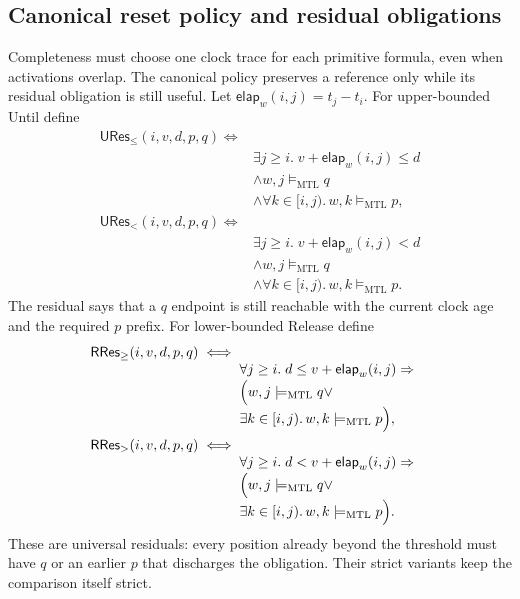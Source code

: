 \documentclass{ieeeaccess}
\newcommand{\satM}{\models_{\mathrm{MTL}}}
\newcommand{\elapsed}{\mathsf{elap}}
\begin{document}
\subsection{Canonical reset policy and residual obligations}
\label{subsec:canonical-policy}
Completeness must choose one clock trace for each primitive formula, even
when activations overlap. The canonical policy preserves a reference only
while its residual obligation is still useful. Let
$\mathsf{elap}_w(i,j)=t_j-t_i$. For upper-bounded Until define
\begin{align}
\mathsf{URes}_{\le}(i,v,d,p,q)\iff{}\\[-1mm]
&\exists j\ge i.\;v+\elapsed_w(i,j)\le d\nonumber\\[-1mm]
&\land w,j\satM q\nonumber\\[-1mm]
&\land\forall k\in[i,j).\,w,k\satM p,\label{eq:ures-le}\\
\mathsf{URes}_{<}(i,v,d,p,q)\iff{}\\[-1mm]
&\exists j\ge i.\;v+\elapsed_w(i,j)<d\nonumber\\[-1mm]
&\land w,j\satM q\nonumber\\[-1mm]
&\land\forall k\in[i,j).\,w,k\satM p.\label{eq:ures-lt}
\end{align}
The residual says that a $q$ endpoint is still reachable with the current
clock age and the required $p$ prefix. For lower-bounded Release define
\begin{align}
\mathsf{RRes}_{\ge}(i,v,d,p,q)\iff{}\\[-1mm]
&\forall j\ge i.\;d\le v+\elapsed_w(i,j)\Rightarrow\nonumber\\[-1mm]
&\Bigl(w,j\satM q\lor\nonumber\\[-1mm]
&\exists k\in[i,j).\,w,k\satM p\Bigr),\label{eq:rres-ge}\\
\mathsf{RRes}_{>}(i,v,d,p,q)\iff{}\\[-1mm]
&\forall j\ge i.\;d<v+\elapsed_w(i,j)\Rightarrow\nonumber\\[-1mm]
&\Bigl(w,j\satM q\lor\nonumber\\[-1mm]
&\exists k\in[i,j).\,w,k\satM p\Bigr).\label{eq:rres-gt}
\end{align}
These are universal residuals: every position already beyond the threshold
must have $q$ or an earlier $p$ that discharges the obligation. Their
strict variants keep the comparison itself strict.
\end{document}
